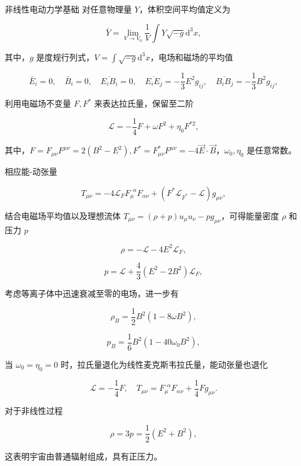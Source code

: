 \documentclass[9pt, dvipsnames]{beamer} %
\begin{document}
\begin{frame}{非线性电动力学基础}
    对任意物理量 $Y$，体积空间平均值定义为

    $$
    \bar{Y}
    =\lim_{V\to V_0} \frac{1 }{V } \int Y\sqrt{-g} \mathrm{d}^3 x,
    $$

    其中，$g$ 是度规行列式，$\displaystyle{V=\int\sqrt{-g}\mathrm{d}^3 x } $，电场和磁场的平均值

    $$
    \bar{E}_i = 0,\quad
    \bar{B}_i = 0,\quad
    \overline{E_i B_i} = 0,\quad
    \overline{E_i E_j} = -\frac{1 }{3 } E^2 g_{ij},\quad
    \overline{B_i B_j} = -\frac{1 }{3 } B^2 g_{ij},
    $$

    利用电磁场不变量 $F,F^*$ 来表达拉氏量，保留至二阶

    $$
    \mathcal{L}=-\frac{1 }{4 } F + \omega F^2 + \eta_0 F^{*2},
    $$

    其中，$F=F_{\mu\nu} F^{\mu\nu}=2(B^2-E^2),F^*=F_{\mu\nu}^*F^{\mu\nu}=-4\vec{E}\cdot\vec{B}$，$\omega_0,\eta_0$ 是任意常数。

    相应能-动张量

    $$
    T_{\mu\nu}
    =-4\mathcal{L}_F F_\mu^{~~\alpha} F_{\alpha\nu} + \left(F^* \mathcal{L}_{F^*} - \mathcal{L} \right) g_{\mu\nu},
    $$

\end{frame}

\begin{frame}
    结合电磁场平均值以及理想流体 $T_{\mu\nu}=(\rho+p)u_\mu u_\nu-p g_{\mu\nu}$，可得能量密度 $\rho$ 和压力 $p$

    $$
    \rho = -\mathcal{L} - 4E^2 \mathcal{L}_F,
    $$

    $$
    p = \mathcal{L} + \frac{4 }{3 } \left(E^2-2B^2 \right)\mathcal{L}_F,
    $$

    考虑等离子体中迅速衰减至零的电场，进一步有

    $$
    \rho_B = \frac{1 }{2 } B^2\left(1-8\omega B^2 \right),
    $$


    $$
    p_B = \frac{1 }{6 } B^2 \left(1-40\omega_0 B^2 \right),
    $$

    当 $\omega_0=\eta_0=0$ 时，拉氏量退化为线性麦克斯韦拉氏量，能动张量也退化

    $$
    \mathcal{L} = -\frac{1 }{4 } F,\quad
    T_{\mu\nu} = F_\mu^{~~\alpha} F_{\alpha\nu} + \frac{1 }{4 } F g_{\mu\nu}.
    $$

    对于非线性过程

    $$
    \rho = 3p = \frac{1 }{2 } \left(E^2 + B^2 \right),
    $$

    这表明宇宙由普通辐射组成，具有正压力。

\end{frame}
\end{document}
